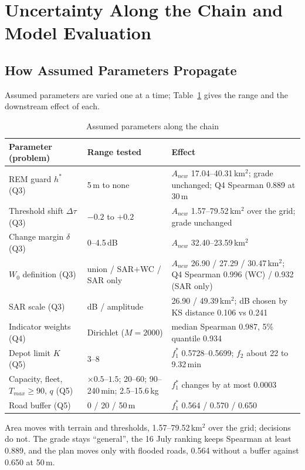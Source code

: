 \section{Uncertainty Along the Chain and Model Evaluation}
\label{sec:eval}

\subsection{How Assumed Parameters Propagate}

Assumed parameters are varied one at a time; Table~\ref{tab:sens_chain} gives the range and the downstream effect of each.

\begin{table}[!ht]
\centering
\caption{Assumed parameters along the chain}
\label{tab:sens_chain}
\small
\begin{tabular}{p{}p{}p{}}
\toprule
Parameter (problem) & Range tested & Effect \\
\midrule
REM guard $h^*$ (Q3) & 5\,m to none & $A_{new}$ 17.04--40.31\,km$^2$; grade unchanged; Q4 Spearman 0.889 at 30\,m \\
Threshold shift $\Delta\tau$ (Q3) & $-0.2$ to $+0.2$ & $A_{new}$ 1.57--79.52\,km$^2$ over the grid; grade unchanged \\
Change margin $\delta$ (Q3) & 0--4.5\,dB & $A_{new}$ 32.40--23.59\,km$^2$ \\
$W_0$ definition (Q3) & union / SAR$+$WC / SAR only & $A_{new}$ 26.90 / 27.29 / 30.47\,km$^2$; Q4 Spearman 0.996 (WC) / 0.932 (SAR only) \\
SAR scale (Q3) & dB / amplitude & 26.90 / 49.39\,km$^2$; dB chosen by KS distance 0.106 vs 0.241 \\
Indicator weights (Q4) & Dirichlet ($M{=}2000$) & median Spearman 0.987, 5\% quantile 0.934 \\
Depot limit $K$ (Q5) & 3--8 & $f_1^*$ 0.5728--0.5699; $f_2$ about 22 to 9.32\,min \\
Capacity, fleet, $T_{max}\ge90$, $q$ (Q5) & $\times0.5$--$1.5$; 20--60; 90--240\,min; 2.5--15.6\,kg & $f_1^*$ changes by at most 0.0003 \\
Road buffer (Q5) & 0 / 20 / 50\,m & $f_1^*$ 0.564 / 0.570 / 0.650 \\
\bottomrule
\end{tabular}
\end{table}

Area moves with terrain and thresholds, 1.57--79.52\,km$^2$ over the grid; decisions do not. The grade stays ``general'', the 16 July ranking keeps Spearman at least 0.889, and the plan moves only with flooded roads, 0.564 without a buffer against 0.650 at 50\,m.

